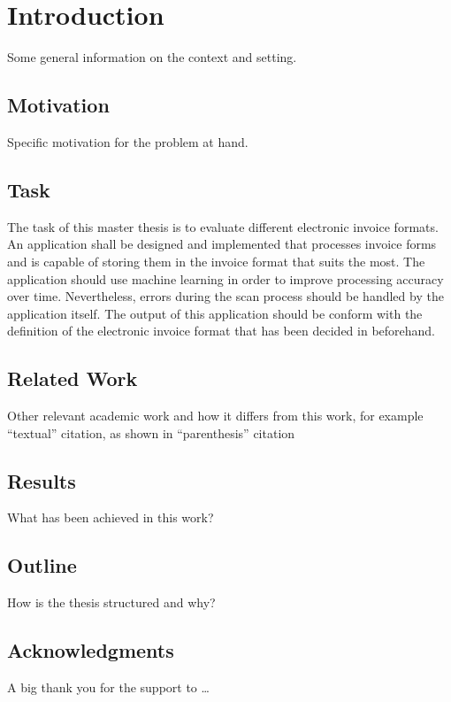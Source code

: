 %
% 

\chapter{Introduction}

Some general information on the context and setting. %


\section{Motivation}

Specific motivation for the problem at hand. %


\section{Task}

The task of this master thesis is to evaluate different electronic invoice formats. An application shall be designed and implemented that processes invoice forms and is capable of storing them in the invoice format that suits the most.
The application should use machine learning in order to improve processing accuracy over time. Nevertheless, errors during the scan process should be handled by the application itself.
The output of this application should be conform with the definition of the electronic invoice format that has been decided in beforehand.



\section{Related Work}

Other relevant academic work and how it differs from this work, for
example %
``textual'' citation, as shown in %
``parenthesis'' citation %



\section{Results}

What has been achieved in this work? %


\section{Outline}

How is the thesis structured and why? %


\section{Acknowledgments}

A big thank you for the support to \ldots %

